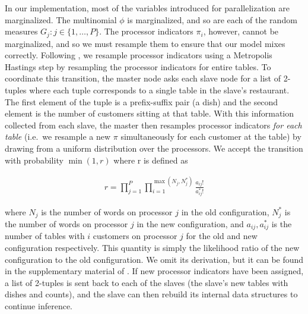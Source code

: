 In our implementation, most of the variables introduced for
parallelization are marginalized. The multinomial $\phi$ is
marginalized, and so are each of the random measures $G_j : j \in \{1,
\ldots, P\}$. The processor indicators $\pi_i$, however, cannot be
marginalized, and so we must resample them to ensure that our model
mixes correctly. Following \cite{williamson2013}, we resample
processor indicators using a Metropolis Hastings step by resampling
the processor indicators for entire tables. To coordinate this
transition, the master node asks each slave node for a list of
2-tuples where each tuple corresponds to a single table in the slave's
restaurant. The first element of the tuple is a prefix-suffix pair (a
dish) and the second element is the number of customers sitting at
that table. With this information collected from each slave, the
master then resamples processor indicators \textit{for each table}
(i.e.~we resample a new $\pi$ simultaneously for each customer at the
table) by drawing from a uniform distribution over the processors. We
accept the transition with probability $\min(1, r)$ where r is defined
as

\begin{align}
  r = \prod_{j = 1}^P \prod_{i=1}^{\max(N_j, N_j^*)} \frac{a_{ij}!}{a_{ij}^*!}
\end{align}

where $N_j$ is the number of words on processor $j$ in the old
configuration, $N_j^*$ is the number of words on processor $j$ in the
new configuration, and $a_{ij}, a_{ij}^*$ is the number of tables with
$i$ customers on processor $j$ for the old and new configuration
respectively. This quantity is simply the likelihood ratio of the new
configuration to the old configuration. We omit its derivation, but it
can be found in the supplementary material of
\cite{williamson2013}. If new processor indicators have been assigned,
a list of 2-tuples is sent back to each of the slaves (the slave's new
tables with dishes and counts), and the slave can then rebuild its
internal data structures to continue inference.
